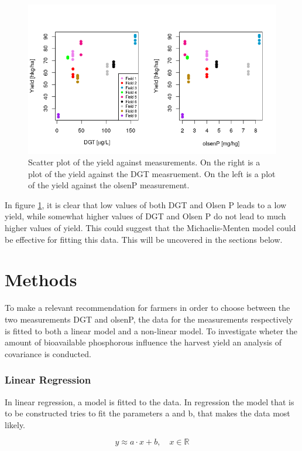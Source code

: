 \documentclass[11pt, fleqn, titlepage]{article}
\begin{document}
\begin{figure}[H]
	\centering
	\includegraphics[width=0.7\linewidth]{billeder/measurementz}
	\caption{Scatter plot of the yield against measurements. On the right is a plot of the yield against the DGT measruement. On the left is a plot of the yield against the olsenP measurement.}
	\label{fig:measurementz}
\end{figure}

In figure \ref{fig:measurementz}, it is clear that low values of both DGT and Olsen P leads to a low yield, while somewhat higher values of DGT and Olsen P do not lead to much higher values of yield. This could suggest that the Michaelis-Menten model could be effective for fitting this data. This will be uncovered in the sections below.

\section{Methods}
To make a relevant recommendation for farmers in order to choose between the two measurements DGT and olsenP, the data for the measurements respectively is fitted to both a linear model and a non-linear model. To investigate wheter the amount of bioavailable phosphorous influence the harvest yield an analysis of covariance is conducted.

\subsubsection*{Linear Regression}
In linear regression, a model is fitted to the data. In regression the model that is to be constructed tries to fit the parameters a and b, that makes the data most likely.

\[ y \approx a \cdot x + b, \quad x \in \mathbb R  \]
\end{document}
